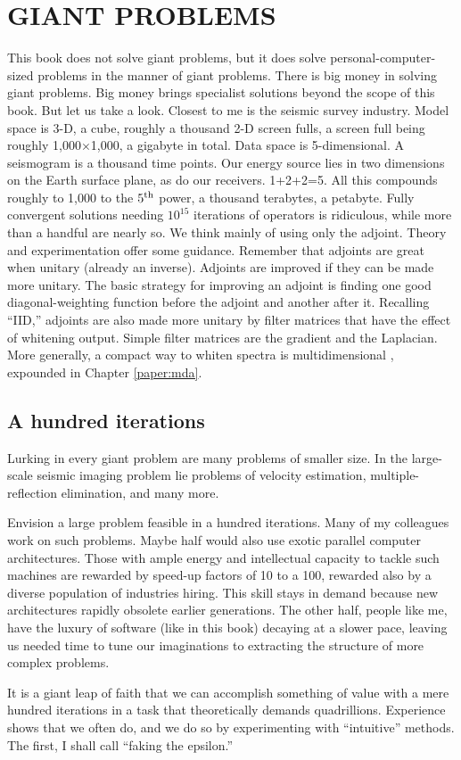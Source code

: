\section{GIANT PROBLEMS}
This book does not solve giant problems,
but it does solve personal-computer-sized problems
in the manner of giant problems.
There is big money in solving giant problems.
Big money brings specialist solutions beyond the scope of this book.
But let us take a look.
Closest to me is the seismic survey industry.
Model space is 3-D, a cube, roughly a thousand 2-D screen fulls,
a screen full being roughly 1,000$\times$1,000,
a gigabyte in total.
Data space is 5-dimensional.
A seismogram is a thousand time points.
Our energy source lies in two dimensions on the Earth surface plane,
as do our receivers.
1+2+2=5.
All this compounds roughly to 1,000 to the $5^{\rm th}$ power,
a thousand terabytes, a petabyte.
Fully convergent solutions needing $10^{15}$ iterations
of operators is ridiculous, while more than a handful are nearly so.
We think mainly of using only the adjoint.
Theory and experimentation offer some guidance.
Remember that adjoints are great when unitary (already an inverse).
Adjoints are improved if they can be made more unitary.
The basic strategy for improving an adjoint is
finding one good diagonal-weighting function before the adjoint and another after it.
Recalling ``IID,'' adjoints are also made more unitary
by filter matrices that have the effect of whitening output.
Simple filter matrices are the gradient and the Laplacian.
More generally,
a compact way to whiten spectra
is multidimensional ,
expounded in Chapter \ref{paper:mda}.

\subsection{A hundred iterations}
Lurking in every giant problem are many problems of smaller size.
In the large-scale seismic imaging problem
lie problems of velocity estimation, multiple-reflection elimination, and many more.
\par
Envision a large problem feasible in a hundred iterations.
Many of my colleagues work on such problems.
Maybe half would also use exotic parallel computer architectures.
Those with ample energy and intellectual capacity to tackle such machines
are rewarded by speed-up factors of 10 to a 100,
rewarded also by a diverse population of industries hiring.
This skill stays in demand because new architectures
rapidly obsolete earlier generations.
The other half, people like me, have the luxury
of software (like in this book) decaying at a slower pace,
leaving us needed time to tune our imaginations
to extracting the structure of more complex problems.
\par
It is a giant leap of faith that we can accomplish something of value
with a mere hundred iterations in a task
that theoretically demands quadrillions.
Experience shows that we often do,
and we do so by experimenting with ``intuitive'' methods.
The first,
I shall call ``faking the epsilon.''



